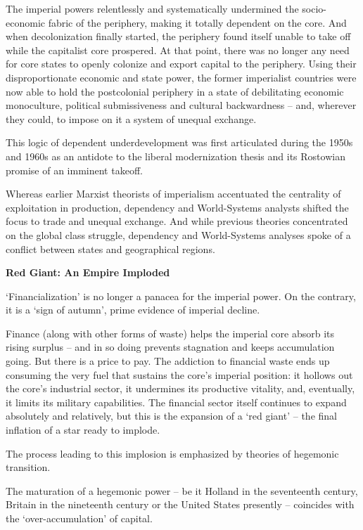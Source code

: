 \documentclass[
]{book}
\begin{document}
The imperial powers relentlessly and systematically
undermined the socio-economic fabric of the periphery, making it totally dependent on
the core. And when decolonization finally started, the periphery found itself unable to
take off while the capitalist core prospered.
At that
point, there was no longer any need for core states to openly colonize and export capital
to the periphery. Using their disproportionate economic and state power, the former
imperialist countries were now able to hold the postcolonial periphery in a state of
debilitating economic monoculture, political submissiveness and cultural backwardness
-- and, wherever they could, to impose on it a system of unequal exchange.

This logic of dependent underdevelopment was first articulated during the
1950s and 1960s as an antidote to the liberal modernization thesis and its Rostowian
promise of an imminent takeoff.

Whereas earlier Marxist
theorists of imperialism accentuated the centrality of exploitation in production,
dependency and World-Systems analysts shifted the focus to trade and unequal
exchange. And while previous theories concentrated on the global class struggle,
dependency and World-Systems analyses spoke of a conflict between states and
geographical regions.

\textbf{Red Giant: An Empire Imploded}

`Financialization' is no longer a panacea for the
imperial power. On the contrary, it is a `sign of autumn', prime evidence of imperial
decline.

Finance (along with other
forms of waste) helps the imperial core absorb its rising surplus -- and in so doing
prevents stagnation and keeps accumulation going. But there is a price to pay. The
addiction to financial waste ends up consuming the very fuel that sustains the core's
imperial position: it hollows out the core's industrial sector, it undermines its productive
vitality, and, eventually, it limits its military capabilities. The financial sector itself
continues to expand absolutely and relatively, but this is the expansion of a `red giant' --
the final inflation of a star ready to implode.

The process leading to this implosion is emphasized by theories of hegemonic
transition.

The maturation of a hegemonic power -- be it Holland in the
seventeenth century, Britain in the nineteenth century or the United States presently --
coincides with the `over-accumulation' of capital.
\end{document}
